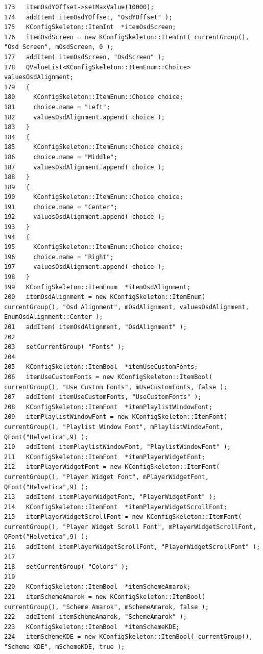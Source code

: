 \begin{verbatim}
173   itemOsdYOffset->setMaxValue(10000);
174   addItem( itemOsdYOffset, "OsdYOffset" );
175   KConfigSkeleton::ItemInt  *itemOsdScreen;
176   itemOsdScreen = new KConfigSkeleton::ItemInt( currentGroup(), "Osd Screen", mOsdScreen, 0 );
177   addItem( itemOsdScreen, "OsdScreen" );
178   QValueList<KConfigSkeleton::ItemEnum::Choice> valuesOsdAlignment;
179   {
180     KConfigSkeleton::ItemEnum::Choice choice;
181     choice.name = "Left";
182     valuesOsdAlignment.append( choice );
183   }
184   {
185     KConfigSkeleton::ItemEnum::Choice choice;
186     choice.name = "Middle";
187     valuesOsdAlignment.append( choice );
188   }
189   {
190     KConfigSkeleton::ItemEnum::Choice choice;
191     choice.name = "Center";
192     valuesOsdAlignment.append( choice );
193   }
194   {
195     KConfigSkeleton::ItemEnum::Choice choice;
196     choice.name = "Right";
197     valuesOsdAlignment.append( choice );
198   }
199   KConfigSkeleton::ItemEnum  *itemOsdAlignment;
200   itemOsdAlignment = new KConfigSkeleton::ItemEnum( currentGroup(), "Osd Alignment", mOsdAlignment, valuesOsdAlignment, EnumOsdAlignment::Center );
201   addItem( itemOsdAlignment, "OsdAlignment" );
202 
203   setCurrentGroup( "Fonts" );
204 
205   KConfigSkeleton::ItemBool  *itemUseCustomFonts;
206   itemUseCustomFonts = new KConfigSkeleton::ItemBool( currentGroup(), "Use Custom Fonts", mUseCustomFonts, false );
207   addItem( itemUseCustomFonts, "UseCustomFonts" );
208   KConfigSkeleton::ItemFont  *itemPlaylistWindowFont;
209   itemPlaylistWindowFont = new KConfigSkeleton::ItemFont( currentGroup(), "Playlist Window Font", mPlaylistWindowFont, QFont("Helvetica",9) );
210   addItem( itemPlaylistWindowFont, "PlaylistWindowFont" );
211   KConfigSkeleton::ItemFont  *itemPlayerWidgetFont;
212   itemPlayerWidgetFont = new KConfigSkeleton::ItemFont( currentGroup(), "Player Widget Font", mPlayerWidgetFont, QFont("Helvetica",9) );
213   addItem( itemPlayerWidgetFont, "PlayerWidgetFont" );
214   KConfigSkeleton::ItemFont  *itemPlayerWidgetScrollFont;
215   itemPlayerWidgetScrollFont = new KConfigSkeleton::ItemFont( currentGroup(), "Player Widget Scroll Font", mPlayerWidgetScrollFont, QFont("Helvetica",9) );
216   addItem( itemPlayerWidgetScrollFont, "PlayerWidgetScrollFont" );
217 
218   setCurrentGroup( "Colors" );
219 
220   KConfigSkeleton::ItemBool  *itemSchemeAmarok;
221   itemSchemeAmarok = new KConfigSkeleton::ItemBool( currentGroup(), "Scheme Amarok", mSchemeAmarok, false );
222   addItem( itemSchemeAmarok, "SchemeAmarok" );
223   KConfigSkeleton::ItemBool  *itemSchemeKDE;
224   itemSchemeKDE = new KConfigSkeleton::ItemBool( currentGroup(), "Scheme KDE", mSchemeKDE, true );

\end{verbatim}
